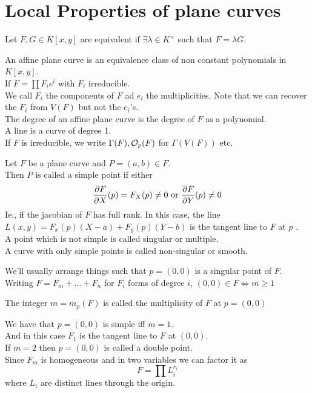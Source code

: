 \documentclass[../main.tex]{subfiles}
\begin{document}
\section{Local Properties of plane curves }
\begin{defn}
	Let $F,G\in K[x,y]$ are equivalent if $\exists \lambda\in K^{\times} $ such that $F= \lambda  G$.
\end{defn}
An affine plane curve is an equivalence class of non constant polynomials in $K[x,y]$.\\
If $F= \prod F_i e^{i}$ with $F_i$ irreducible.\\
We call $F_i$ the components of $F$ ad $e_i$ the multiplicities.
Note that we can recover the $F_i$ from $V( F) $ but not the $e_i$'s.\\
The degree of an affine plane curve is the degree of $F$ as a polynomial.\\
A line is a curve of degree 1.\\
If $F$ is irreducible, we write $\Gamma( F) , \mathcal{O}_p( F) $ for $\Gamma( V( F) ) $ etc.
\begin{defn}
	Let $F$ be a plane curve and $P= ( a,b) \in F$.\\
	Then $P$ is called a simple point if either
	\[ 
	\frac{\partial F}{\partial X}( p)  = F_X( p) \neq 0 \text{ or } \frac{\partial F}{\partial Y}( p) \neq 0
	\]
	Ie., if the jacobian of $F$ has full rank.
In this case, the line $L( x,y) = F_x( p) ( X-a) + F_y( p) ( Y-b) $ is the tangent line to $F$ at $p$ 	.\\
A point which is not simple is called singular or multiple.\\
A curve with only simple points is called non-singular or smooth.
\end{defn}
We'll usually arrange things such that $p= ( 0,0) $ is a singular point of $F$.\\
Writing $F= F_m+\ldots + F_n$ for $F_i$ forms of degree $i$, $( 0,0) \in F\iff m \geq 1$ 	
\begin{defn}
The integer $m= m_{p} ( F) $ is called the multiplicity of $F$ at $p= ( 0,0) $ 	
\end{defn}
We have that $p=( 0,0) $ is simple iff $m=1$.\\
And in this case $F_1$ is the tangent line to $F$ at $( 0,0) $.\\
If $m=2$ then $p=( 0,0) $ is called a double point.\\
Since $F_m$ is homogeneous and in two variables we can factor it as
\[ 
F= \prod L_i^{r_i}
\]
where $L_i$ are distinct lines through the origin.\\
\end{document}
